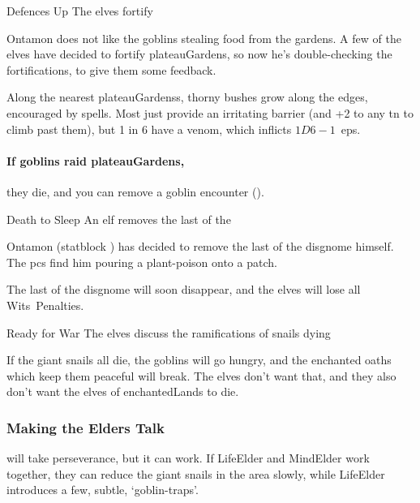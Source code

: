 \begin{multicols}{2}

{Defences Up}%
{The elves fortify }%

Ontamon does not like the goblins stealing food from the gardens.
A few of the elves have decided to fortify \gls{plateauGardens}, so now he's double-checking the fortifications, to give them some feedback.

Along the nearest \glspl{plateauGardens}, thorny bushes grow along the edges, encouraged by \glspl{spell}.
Most just provide an irritating barrier (and +2 to any \gls{tn} to climb past them), but 1 in 6 have a venom, which inflicts $1D6-1$~\glspl{ep}.

\paragraph{If goblins raid \gls{plateauGardens},}
they die, and you can remove a goblin encounter ().

\label{ontamon}

{\small
  \showStdSpells
}

{Death to Sleep}%
{An elf removes the last of the }%

Ontamon (\gls{statblock} ) has decided to remove the last of the \gls{disgnome} himself.
The \glspl{pc} find him pouring a plant-poison onto a patch.

The last of the \gls{disgnome} will soon disappear, and the elves will lose all Wits~Penalties.

{Ready for War}%
{The elves discuss the ramifications of snails dying}%

If the giant snails all die, the goblins will go hungry, and the enchanted oaths which keep them peaceful will break.
The elves don't want that, and they also don't want the elves of \gls{enchantedLands} to die.

\stopcontents[segments]

\subsubsection{Making the Elders Talk}
will take perseverance, but it can work.
If \gls{LifeElder} and \gls{MindElder} work together, they can  reduce the giant snails in the area slowly, while \gls{LifeElder} introduces a few, subtle, `goblin-traps'.


\end{multicols}

